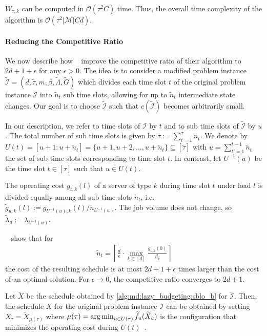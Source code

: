 $W_{\tau,k}$ can be computed in $\mathcal{O}(\tau^2 C)$ time. Thus, the overall time complexity of the algorithm is $\mathcal{O}(\tau^2 |\mathcal{M}| C d)$.

\paragraph{Reducing the Competitive Ratio}

We now describe how \citeauthor*{Albers2021_2}~\cite{Albers2021_2} improve the competitive ratio of their algorithm to $2d + 1 + \epsilon$ for any $\epsilon > 0$. The idea is to consider a modified problem instance $\widetilde{\mathcal{I}} = (d, \widetilde{\tau}, m, \beta, \widetilde{\Lambda}, \widetilde{G})$ which divides each time slot $t$ of the original problem instance $\mathcal{I}$ into $\widetilde{n}_t$ sub time slots, allowing for up to $\widetilde{n}_t$ intermediate state changes. Our goal is to choose $\widetilde{\mathcal{I}}$ such that $c(\widetilde{\mathcal{I}})$ becomes arbitrarily small.

In our description, we refer to time slots of $\mathcal{I}$ by $t$ and to sub time slots of $\widetilde{\mathcal{I}}$ by $u$. The total number of sub time slots is given by $\widetilde{\tau} := \sum_{t=1}^{\tau} \widetilde{n}_t$. We denote by $U(t) = [u+1 : u+\widetilde{n}_t] = \{u+1, u+2, \dots, u+\widetilde{n}_t\} \subseteq [\widetilde{\tau}]$ with $u = \sum_{t'=1}^{t-1} \widetilde{n}_t$ the set of sub time slots corresponding to time slot $t$. In contrast, let $U^{-1}(u)$ be the time slot $t \in [\tau]$ such that $u \in U(t)$.

The operating cost $g_{t,k}(l)$ of a server of type $k$ during time slot $t$ under load $l$ is divided equally among all sub time slots $\widetilde{n}_t$, i.e. $\widetilde{g}_{u,k}(l) := g_{U^{-1}(u),k}(l) / \widetilde{n}_{U^{-1}(u)}$. The job volume does not change, so $\widetilde{\lambda}_u := \lambda_{U^{-1}(u)}$.

\citeauthor*{Albers2021_2}~\cite{Albers2021_2} show that for \begin{align*}
    \widetilde{n}_t = \left\lceil\frac{d}{\epsilon} \cdot \max_{k \in [d]} \frac{g_{t,k}(0)}{\beta_k}\right\rceil
\end{align*} the cost of the resulting schedule is at most $2d + 1 + \epsilon$ times larger than the cost of an optimal solution. For $\epsilon \to 0$, the competitive ratio converges to $2d + 1$.

Let $\widetilde{X}$ be the schedule obtained by \cref{alg:md:lazy_budgeting:sblo_b} for $\widetilde{\mathcal{I}}$. Then, the schedule $X$ for the original problem instance $\mathcal{I}$ can be obtained by setting $X_{\tau} = \widetilde{X}_{\mu(\tau)}$ where $\mu(\tau) = \operatorname*{arg\,min}_{u \in U(\tau)} \widetilde{f}_{u}(\widetilde{X}_u)$ is the configuration that minimizes the operating cost during $U(t)$~\cite{Albers2021_2}.

